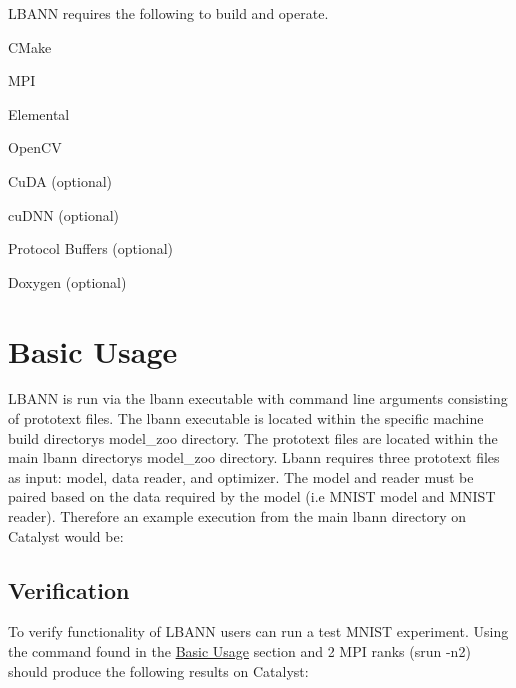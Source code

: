 L\+B\+A\+NN requires the following to build and operate.
\begin{DoxyItemize}
\item C\+Make
\item M\+PI
\item Elemental
\item Open\+CV
\item Cu\+DA (optional)
\item cu\+D\+NN (optional)
\item Protocol Buffers (optional)
\item Doxygen (optional)
\end{DoxyItemize}\hypertarget{getting_started_getting_started_basicusage}{}\section{Basic Usage}\label{getting_started_getting_started_basicusage}
L\+B\+A\+NN is run via the lbann executable with command line arguments consisting of prototext files. The lbann executable is located within the specific machine build directory\textquotesingle{}s model\+\_\+zoo directory. The prototext files are located within the main lbann directory\textquotesingle{}s model\+\_\+zoo directory. Lbann requires three prototext files as input\+: model, data reader, and optimizer. The model and reader must be paired based on the data required by the model (i.\+e M\+N\+I\+ST model and M\+N\+I\+ST reader). Therefore an example execution from the main lbann directory on Catalyst would be\+: 
\hypertarget{getting_started_verification}{}\subsection{Verification}\label{getting_started_verification}
To verify functionality of L\+B\+A\+NN users can run a test M\+N\+I\+ST experiment. Using the command found in the \hyperlink{getting_started_getting_started_basicusage}{Basic Usage} section and 2 M\+PI ranks (srun -\/n2) should produce the following results on Catalyst\+: 
